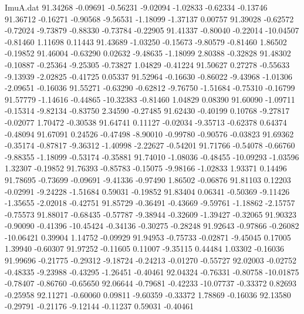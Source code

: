 \begin{filecontents}{ImuA.dat}
  91.34268   -0.09691   -0.56231   -9.02094   -1.02833   -0.62334   -0.13746
  91.36712   -0.16271   -0.90568   -9.56531   -1.18099   -1.37137    0.00757
  91.39028   -0.62572   -0.72024   -9.73879   -0.88330   -0.73784   -0.22905
  91.41337   -0.80040   -0.22014  -10.04507   -0.81460    1.11698    0.11443
  91.43689   -1.03250   -0.15673   -9.80579   -0.81460    1.86502   -0.19852
  91.46004   -0.63290    0.02632   -9.48635   -1.18099    2.80388   -0.32828
  91.48302   -0.10887   -0.25364   -9.25305   -0.73827    1.04829   -0.41224
  91.50627    0.27278   -0.55633   -9.13939   -2.02825   -0.41725    0.05337
  91.52964   -0.16630   -0.86022   -9.43968   -1.01306   -2.09651   -0.16036
  91.55271   -0.63290   -0.62812   -9.76750   -1.51684   -0.75310   -0.16799
  91.57779   -1.14616   -0.44865  -10.32383   -0.81460    1.04829    0.08390
  91.60090   -1.09711   -0.15314   -9.82134   -0.83750    2.34590   -0.27485
  91.62430   -0.40199    0.10768   -9.27817   -0.02077    1.70472   -0.30538
  91.64741    0.11127   -0.02034   -9.35713   -0.62378    0.64374   -0.48094
  91.67091    0.24526   -0.47498   -8.90010   -0.99780   -0.90576   -0.03823
  91.69362   -0.35174   -0.87817   -9.36312   -1.40998   -2.22627   -0.54201
  91.71766   -0.54078   -0.66760   -9.88355   -1.18099   -0.53174   -0.35881
  91.74010   -1.08036   -0.48455  -10.09293   -1.03596    1.32307   -0.19852
  91.76393   -0.85783   -0.15075   -9.98166   -1.02833    1.93371    0.14496
  91.78695   -0.73699   -0.09691   -9.41336   -0.97490    1.86502   -0.06876
  91.81103    0.12203   -0.02991   -9.24228   -1.51684    0.59031   -0.19852
  91.83404    0.06341   -0.50369   -9.11426   -1.35655   -2.02018   -0.42751
  91.85729   -0.36491   -0.43669   -9.59761   -1.18862   -2.15757   -0.75573
  91.88017   -0.68435   -0.57787   -9.38944   -0.32609   -1.39427   -0.32065
  91.90323   -0.90090   -0.41396  -10.45424   -0.34136   -0.30275   -0.28248
  91.92643   -0.97866   -0.26082  -10.06421    0.39904    1.14752   -0.09929
  91.94953   -0.75733   -0.02871   -9.45045    0.17005    1.39940   -0.60307
  91.97252   -0.11605    0.11007   -9.35115    0.44484    1.03302   -0.16036
  91.99696   -0.21775   -0.29312   -9.18724   -0.24213   -0.01270   -0.55727
  92.02003   -0.02752   -0.48335   -9.23988   -0.43295   -1.26451   -0.40461
  92.04324   -0.76331   -0.80758  -10.01875   -0.78407   -0.86760   -0.65650
  92.06644   -0.79681   -0.42233  -10.07737   -0.33372    0.82693   -0.25958
  92.11271   -0.60060    0.09811   -9.60359   -0.33372    1.78869   -0.16036
  92.13580   -0.29791   -0.21176   -9.12144   -0.11237    0.59031   -0.40461

\end{filecontents}
